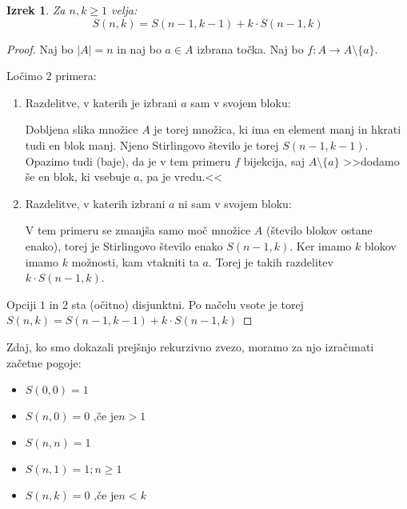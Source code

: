 \documentclass[a4paper, 10pt]{article}
\newtheorem{izr}{Izrek}
\newcommand{\abs}[1]{\ensuremath{\lvert #1 \rvert}}
\begin{document}
\begin{izr}
Za $n, k \geq 1$ velja:
\[
S(n, k) = S(n - 1, k - 1) + k \cdot S(n - 1, k)
\]
\end{izr}

\begin{proof}
Naj bo $\abs{A} = n$ in naj bo $a \in A$ izbrana točka.
Naj bo $f: A \rightarrow A\setminus \{a\}$.

Ločimo $2$ primera:

\begin{enumerate}

\item Razdelitve, v katerih je izbrani $a$ sam v svojem bloku:

Dobljena slika množice $A$ je torej množica, ki ima en element manj in hkrati tudi en blok manj. Njeno Stirlingovo število je torej $S(n - 1, k - 1)$. Opazimo tudi (baje), da je v tem primeru $f$ bijekcija, saj $A\setminus \{a\}$ >>dodamo še en blok, ki vsebuje $a$, pa je vredu.<<

\item Razdelitve, v katerih izbrani $a$ ni sam v svojem bloku:

V tem primeru se zmanjša samo moč množice $A$ (število blokov ostane enako), torej je Stirlingovo število enako $S(n - 1, k)$.
Ker imamo $k$ blokov imamo $k$ možnosti, kam vtakniti ta $a$. Torej je takih razdelitev $k \cdot S(n - 1, k)$.
 
\end{enumerate}
Opciji $1$ in $2$ sta (očitno) disjunktni. Po načelu vsote je torej $S(n, k) = S(n - 1, k - 1) + k \cdot S(n - 1, k)$
\end{proof}
Zdaj, ko smo dokazali prejšnjo rekurzivno zvezo, moramo za njo izračunati začetne pogoje:
\begin{itemize}

\item $S(0,0) = 1$
\item $S(n,0) = 0 \text{~,če je} n > 1 $
\item $S(n, n) = 1$
\item $S(n, 1) = 1; n \geq 1$
\item $S(n, k) = 0 \text{~,če je} n < k$

\end{itemize}
\end{document}
